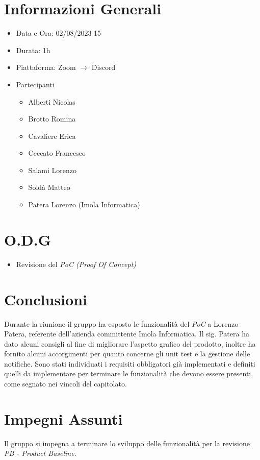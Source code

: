 \documentclass[a4paper, 12pt]{article}
\begin{document}
\makefrontpage
\section*{Informazioni Generali}
\begin{itemize}
    \item Data e Ora: 02/08/2023 15
    \item Durata: 1h
    \item Piattaforma: Zoom $\rightarrow$ Discord
    \item Partecipanti
    \begin{itemize}
        \item Alberti Nicolas
        \item Brotto Romina
        \item Cavaliere Erica
        \item Ceccato Francesco
        \item Salami Lorenzo
        \item Soldà Matteo
        \item Patera Lorenzo (Imola Informatica)
    \end{itemize}
\end{itemize}
\section*{O.D.G}
\begin{itemize}
    \item Revisione del \textit{PoC (Proof Of Concept)}
\end{itemize}
\section*{Conclusioni}
Durante la riunione il gruppo ha esposto le funzionalità del \textit{PoC} a Lorenzo Patera, referente dell'azienda committente Imola Informatica.
Il sig. Patera ha dato alcuni consigli al fine di migliorare l'aspetto grafico del prodotto, inoltre ha fornito alcuni accorgimenti per quanto concerne gli unit test e la gestione delle notifiche.
Sono stati individuati i requisiti obbligatori già implementati e  definiti quelli da implementare per terminare le funzionalità che devono essere presenti, come segnato nei vincoli del capitolato.

\section*{Impegni Assunti}
Il gruppo si impegna a terminare lo sviluppo delle funzionalità per la revisione \textit{PB - Product Baseline}.
\end{document}
